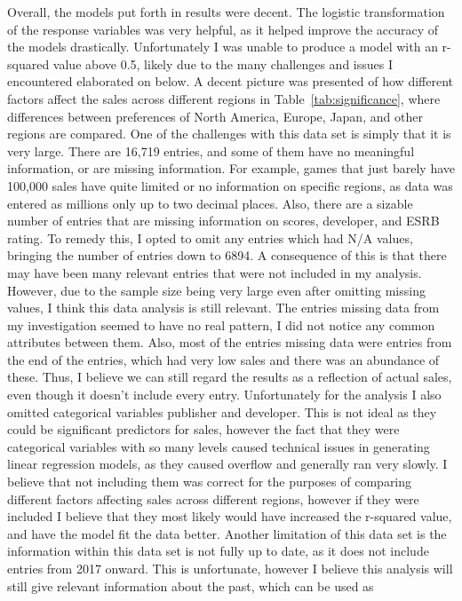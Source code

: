 \documentclass[12pt]{article}
\begin{document}
Overall, the models put forth in results were decent. The logistic transformation of the response variables was very helpful, as it helped improve the accuracy of the models drastically. 
Unfortunately I was unable to produce a model with an r-squared value above 0.5, likely due to the many challenges and issues I encountered elaborated on below.
A decent picture was presented of how different factors affect the sales across different regions in Table~\ref{tab:significance}, where differences between preferences of North America, Europe, Japan, and other regions are compared.
One of the challenges with this data set is simply that it is very large. There are 16,719 entries, and some of them have no meaningful 
information, or are missing information. For example, games that just barely have 100,000 sales have quite limited or no information on 
specific regions, as data was entered as millions only up to two decimal places. Also, there are a sizable number of entries that are 
missing information on scores, developer, and ESRB rating. 
To remedy this, I opted to omit any entries which had N/A values, bringing the number of entries down to 6894. 
A consequence of this is that there may have been many relevant entries that were not included in my analysis.
However, due to the sample size being very large even after omitting missing values, I think this data analysis is still relevant.
The entries missing data from my investigation seemed to have no real pattern, I did not notice any common attributes between them.
Also, most of the entries missing data were entries from the end of the entries, which had very low sales and there was an abundance of these.
Thus, I believe we can still regard the results as a reflection of actual sales, even though it doesn't include every entry.
Unfortunately for the analysis I also omitted categorical variables publisher and developer. This is not ideal as they could be significant predictors for sales, 
however the fact that they were categorical variables with so many levels caused technical issues in generating linear regression models, 
as they caused overflow and generally ran very slowly. I believe that not including them was correct for the purposes of comparing different factors affecting sales across different regions,
however if they were included I believe that they most likely would have increased the r-squared value, and have the model fit the data better.
Another limitation of this data set is the information within this data set is not fully up to date, as it does not include entries from 2017 
onward. This is unfortunate, however I believe this analysis will still give relevant information about the past, which can be used as 
\end{document}
